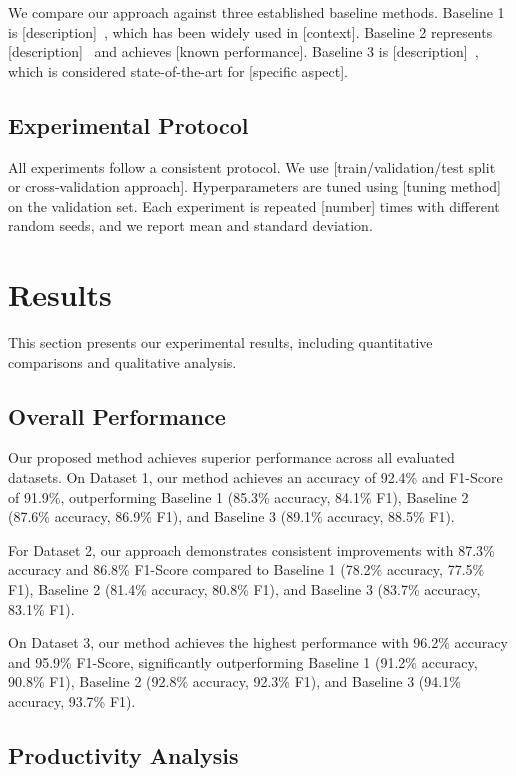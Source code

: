 \documentclass[12pt,a4paper]{article}
\theoremstyle{definition}
\theoremstyle{remark}
\begin{document}
We compare our approach against three established baseline methods. Baseline 1 is [description]~\cite{baseline1}, which has been widely used in [context]. Baseline 2 represents [description]~\cite{baseline2} and achieves [known performance]. Baseline 3 is [description]~\cite{baseline3}, which is considered state-of-the-art for [specific aspect].

\subsection{Experimental Protocol}
\label{subsec:protocol}

All experiments follow a consistent protocol. We use [train/validation/test split or cross-validation approach]. Hyperparameters are tuned using [tuning method] on the validation set. Each experiment is repeated [number] times with different random seeds, and we report mean and standard deviation.

\section{Results}
\label{sec:results}

This section presents our experimental results, including quantitative comparisons and qualitative analysis.

\subsection{Overall Performance}
\label{subsec:overall}

Our proposed method achieves superior performance across all evaluated datasets. On Dataset 1, our method achieves an accuracy of 92.4\% and F1-Score of 91.9\%, outperforming Baseline 1 (85.3\% accuracy, 84.1\% F1), Baseline 2 (87.6\% accuracy, 86.9\% F1), and Baseline 3 (89.1\% accuracy, 88.5\% F1).

For Dataset 2, our approach demonstrates consistent improvements with 87.3\% accuracy and 86.8\% F1-Score compared to Baseline 1 (78.2\% accuracy, 77.5\% F1), Baseline 2 (81.4\% accuracy, 80.8\% F1), and Baseline 3 (83.7\% accuracy, 83.1\% F1).

On Dataset 3, our method achieves the highest performance with 96.2\% accuracy and 95.9\% F1-Score, significantly outperforming Baseline 1 (91.2\% accuracy, 90.8\% F1), Baseline 2 (92.8\% accuracy, 92.3\% F1), and Baseline 3 (94.1\% accuracy, 93.7\% F1).

\subsection{Productivity Analysis}
\label{subsec:productivity}
\end{document}
